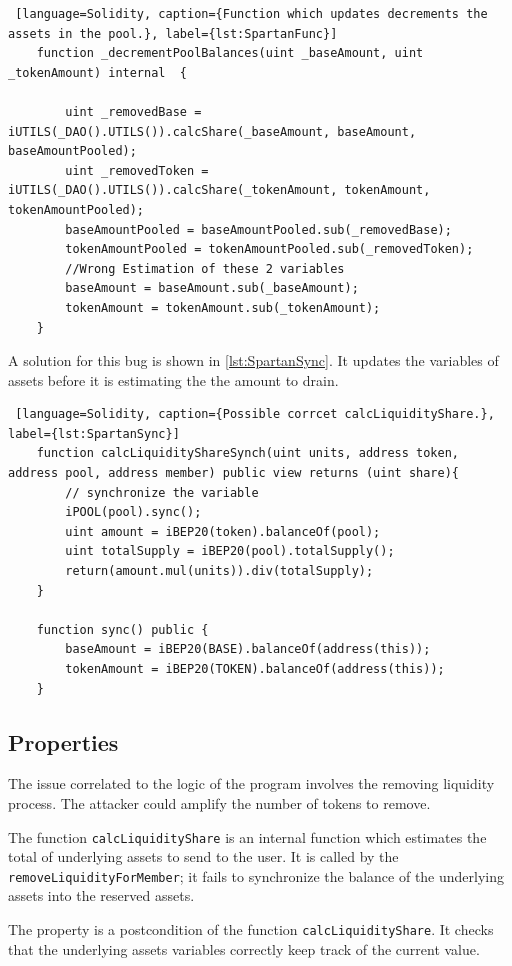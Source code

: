 \begin{lstlisting} [language=Solidity, caption={Function which updates decrements the assets in the pool.}, label={lst:SpartanFunc}]
    function _decrementPoolBalances(uint _baseAmount, uint _tokenAmount) internal  {
        
        uint _removedBase = iUTILS(_DAO().UTILS()).calcShare(_baseAmount, baseAmount, baseAmountPooled);
        uint _removedToken = iUTILS(_DAO().UTILS()).calcShare(_tokenAmount, tokenAmount, tokenAmountPooled);
        baseAmountPooled = baseAmountPooled.sub(_removedBase);
        tokenAmountPooled = tokenAmountPooled.sub(_removedToken); 
        //Wrong Estimation of these 2 variables
        baseAmount = baseAmount.sub(_baseAmount);
        tokenAmount = tokenAmount.sub(_tokenAmount); 
    }
\end{lstlisting}
A solution for this bug is shown in \autoref{lst:SpartanSync}. It updates the variables of assets before it is estimating the 
the amount to drain.
\begin{lstlisting} [language=Solidity, caption={Possible corrcet calcLiquidityShare.}, label={lst:SpartanSync}]
    function calcLiquidityShareSynch(uint units, address token, address pool, address member) public view returns (uint share){
        // synchronize the variable
        iPOOL(pool).sync();  
        uint amount = iBEP20(token).balanceOf(pool);
        uint totalSupply = iBEP20(pool).totalSupply();
        return(amount.mul(units)).div(totalSupply);
    }

    function sync() public {
        baseAmount = iBEP20(BASE).balanceOf(address(this));
        tokenAmount = iBEP20(TOKEN).balanceOf(address(this));
    }
\end{lstlisting}

\subsection{Properties}
The issue correlated to the logic of the program involves the removing liquidity process. 
The attacker could amplify the number of tokens to remove.

The function \texttt{calcLiquidityShare} is an internal function which estimates the total of underlying assets to send to the user. 
It is called by the \texttt{removeLiquidityForMember}; it fails to synchronize the balance of the underlying assets into the reserved assets.

The property is a postcondition of the function \texttt{calcLiquidityShare}. 
It checks that the underlying assets variables correctly keep track of the current value.


